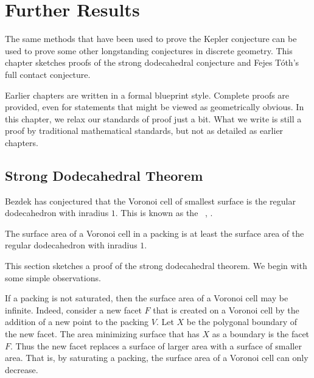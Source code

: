 
\chapter{Further Results}\label{sec:further}


The same methods that have been used to prove the Kepler conjecture
can be used to prove some other longstanding conjectures in discrete
geometry.  This chapter sketches proofs of the strong dodecahedral
conjecture and Fejes T\'oth's full contact conjecture.

Earlier chapters are written in a formal blueprint style.
Complete proofs are provided, even for statements that might be
viewed as geometrically obvious.  In this chapter, we relax our
standards of proof just a bit.  What we write is still a proof by
traditional mathematical standards, but not as detailed as earlier
chapters.

\section{Strong Dodecahedral Theorem}

Bezdek has conjectured that the Voronoi cell of smallest surface is
the regular dodecahedron with inradius $1$.  This is known as the
~\cite{Bezdek00}, \cite{Bezdek05}.  
%
%
%


\begin{theorem}
  The surface area of a Voronoi cell in a packing is at least the
  surface area of the regular dodecahedron with inradius $1$.
\end{theorem}

This section sketches a proof of the strong dodecahedral theorem.  We
begin with some simple observations.

\begin{remark}
  If a packing is not saturated, then the surface area of a Voronoi
  cell may be infinite.  
  Indeed, consider a new facet $F$ that is created on a Voronoi cell
  by the addition of a new point to the packing $V$.  Let $X$ be the
  polygonal boundary of the new facet.  The area minimizing surface
  that has $X$ as a boundary is the facet $F$.  Thus the new facet
  replaces a surface of larger area with a surface of smaller area.
  That is, by saturating a packing, the surface area of a Voronoi cell
  can only decrease.
\end{remark}


